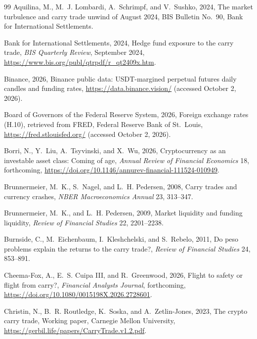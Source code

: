 \documentclass[11pt]{article}
\begin{document}
\clearpage
{}
\begin{thebibliography}{99}
Aquilina, M., M.~J. Lombardi, A.~Schrimpf, and V.~Sushko, 2024, The market turbulence and carry trade unwind of August 2024, BIS Bulletin No.~90, Bank for International Settlements.

Bank for International Settlements, 2024, Hedge fund exposure to the carry trade, \textit{BIS Quarterly Review}, September 2024, \url{https://www.bis.org/publ/qtrpdf/r_qt2409x.htm}.

Binance, 2026, Binance public data: USDT-margined perpetual futures daily candles and funding rates, \url{https://data.binance.vision/} (accessed October 2, 2026).

Board of Governors of the Federal Reserve System, 2026, Foreign exchange rates (H.10), retrieved from FRED, Federal Reserve Bank of St.~Louis, \url{https://fred.stlouisfed.org/} (accessed October 2, 2026).

Borri, N., Y.~Liu, A.~Tsyvinski, and X.~Wu, 2026, Cryptocurrency as an investable asset class: Coming of age, \textit{Annual Review of Financial Economics} 18, forthcoming, \url{https://doi.org/10.1146/annurev-financial-111524-010949}.

Brunnermeier, M.~K., S.~Nagel, and L.~H. Pedersen, 2008, Carry trades and currency crashes, \textit{NBER Macroeconomics Annual} 23, 313--347.

Brunnermeier, M.~K., and L.~H. Pedersen, 2009, Market liquidity and funding liquidity, \textit{Review of Financial Studies} 22, 2201--2238.

Burnside, C., M.~Eichenbaum, I.~Kleshchelski, and S.~Rebelo, 2011, Do peso problems explain the returns to the carry trade?, \textit{Review of Financial Studies} 24, 853--891.

Cheema-Fox, A., E.~S. Cuipa III, and R.~Greenwood, 2026, Flight to safety or flight from carry?, \textit{Financial Analysts Journal}, forthcoming, \url{https://doi.org/10.1080/0015198X.2026.2728601}.

Christin, N., B.~R. Routledge, K.~Soska, and A.~Zetlin-Jones, 2023, The crypto carry trade, Working paper, Carnegie Mellon University, \url{https://gerbil.life/papers/CarryTrade.v1.2.pdf}.


\end{thebibliography}
\end{document}
